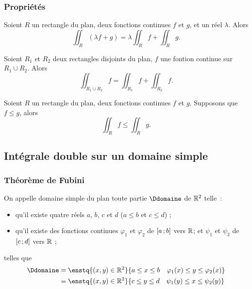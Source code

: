 \subsubsection{Propriétés}

\begin{prop}
  Soient $R$ un rectangle du plan, deux fonctions continues $f$ et $g$, et un réel $\lambda$. Alors
  \begin{equation}
    \iint_R (\lambda f+g) = \lambda \iint_R f + \iint_R g.
  \end{equation}
\end{prop}
\begin{prop}
  Soient $R_1$ et $R_2$ deux rectangles disjoints du plan, $f$ une fontion continue sur $R_1 \cup R_2$. Alors
  \begin{equation}
    \iint_{R_1 \cup R_2} f = \iint_{R_1} f + \iint_{R_2} f.
  \end{equation}
\end{prop}
\begin{prop}
  Soient $R$ un rectangle du plan, deux fonctions continues $f$ et $g$. Supposons que $f \leq g$, alors
  \begin{equation}
    \iint_R f \leq \iint_R g.
  \end{equation}
\end{prop}

\subsection{Intégrale double sur un domaine simple}

\subsubsection{Théorème de Fubini}

\begin{defdef}
  On appelle domaine simple du plan toute partie $\Ddomaine$ de $\mathbb{R}^2$ telle~:
  \begin{itemize}
  \item qu'il existe quatre réels $a$, $b$, $c$ et $d$ ($a\leq b$ et $c \leq d$) ;
  \item qu'il existe des fonctions continues $\varphi_1$ et $\varphi_2$ de $\left[ a \, ;  b \right]$ vers $\mathbb{R}$; et $\psi_1$ et $\psi_2$ de $\left[ c \, ;  d \right]$ vers $\mathbb{R}$ ;
  \end{itemize}
  telles que
  \begin{align}
    \Ddomaine&=\enstq{(x,y)\in\R^2}{a\leq x\leq b \quad \varphi_1(x)\leq y\leq \varphi_2(x)}\\
    &=\enstq{(x,y)\in\R^2}{c \leq y \leq d \quad \psi_1(y) \leq x \leq \psi_2(y)}
  \end{align}
\end{defdef}

